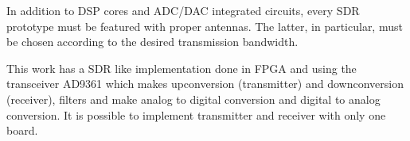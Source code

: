 In addition to DSP cores and ADC/DAC integrated circuits, every SDR prototype
must be featured with proper antennas. The latter, in particular, must be
chosen according to the desired transmission bandwidth.

This work has a SDR like implementation done in FPGA and using the transceiver
AD9361 which makes upconversion (transmitter) and downconversion
(receiver), filters and make analog to digital conversion and digital to analog
conversion. It is possible to implement transmitter and receiver with only
one board.
